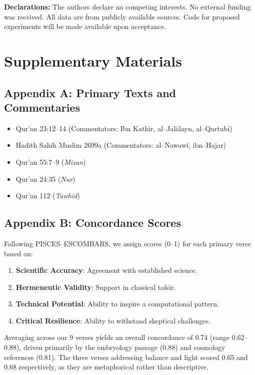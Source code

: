 \documentclass[12pt,twocolumn]{article}
\begin{document}
\noindent\textbf{Declarations:} The authors declare no competing interests. No external funding was received. All data are from publicly available sources. Code for proposed experiments will be made available upon acceptance.




\appendix
\section{Supplementary Materials}
\subsection*{Appendix A: Primary Texts and Commentaries}
\begin{itemize}[leftmargin=*]
\item Qur'an 23:12--14 (Commentators: Ibn Kathīr, al--Jalālayn, al--Qurtubī)
\item Hadith Sahih Muslim 2699a (Commentators: al--Nawawī, ibn--Hajar)
\item Qur'an 55:7--9 (\emph{Mizan})
\item Qur'an 24:35 (\emph{Nur})
\item Qur'an 112 (\emph{Tawhid})
\end{itemize}

\subsection*{Appendix B: Concordance Scores}
Following PISCES--ESCOMBARS, we assign scores (0--1) for each primary verse based on:
\begin{enumerate}[label=\arabic*.]
\item \textbf{Scientific Accuracy}: Agreement with established science.
\item \textbf{Hermeneutic Validity}: Support in classical tafsīr.
\item \textbf{Technical Potential}: Ability to inspire a computational pattern.
\item \textbf{Critical Resilience}: Ability to withstand skeptical challenges.
\end{enumerate}
Averaging across our 9 verses yields an overall concordance of 0.74 (range 0.62--0.88), driven primarily by the embryology passage (0.88) and cosmology references (0.81). The three verses addressing balance and light scored 0.65 and 0.68 respectively, as they are metaphorical rather than descriptive.
\end{document}
